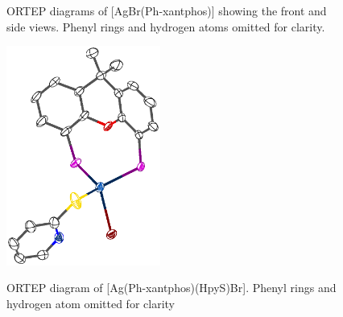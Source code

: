 \begin{figure}[h]
\begin{center}
\begin{minipage}[c]{0.4\textwidth}
\end{minipage}
\caption[ORTEP diagrams of AgBr(Ph-xantphos)]{ORTEP diagrams of [AgBr(Ph-xantphos)] showing the front and side views.\cite{Kaltzoglou2007}  Phenyl rings and hydrogen atoms omitted for clarity.}
\vspace{0.2cm}
\label{AgxantphosBr}
\end{center}
\end{figure}
\vspace{0.2cm}

\begin{figure}[htb] 
\begin{center}
\vspace{0.5cm}
\includegraphics[width=0.45\textwidth]{../Othercrystals/AgxantphosBrHpyS.eps}
\caption[ORTEP diagram of Ag(Ph-xantphos)(HpyS)Br]{ORTEP diagram of [Ag(Ph-xantphos)(HpyS)Br].\cite{Kaltzoglou2007} Phenyl rings and hydrogen atom omitted for clarity}
\vspace{0.2cm}
\label{AgxantphosBrHpyS}
\end{center}
\end{figure}
\vspace{0.2cm}


